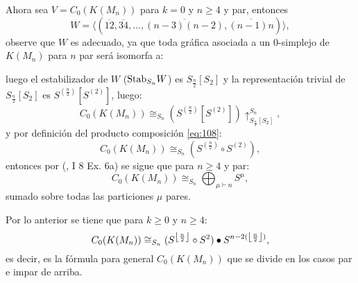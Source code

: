 \documentclass[12pt]{book}
\DeclarePairedDelimiter\floor{\lfloor}{\rfloor}
\theoremstyle{definition}
\newcounter{in}
\newcounter{ini}
\begin{document}
  Ahora sea $V = C_{0}(K(M_n))$ para $k=0$ y $n \geq 4$ y par, entonces
  $$W = \langle (\overline{12},\overline{34},\ldots,\overline{(n-3)(n-2)}, \overline{(n-1)n}) \rangle,$$
    observe que $W$ es adecuado, ya que toda gráfica asociada a un $0$-simplejo de $K(M_{n})$ para $n$ par será isomorfa a:
   \begin{center}
\end{center}
luego el estabilizador de $W$ ($\textup{Stab}_{S_{n}} W$) es
$S_{\frac{n}{2}} \left [ S_{2} \right ]$ y la representación trivial
de $S_{\frac{n}{2}} \left [ S_{2} \right ]$ es $S^{(\frac{n}{2})}
\left [ S^{(2)} \right ]$, luego:
\begin{equation}
C_{0}(K(M_{n})) \cong_{S_{n}} (S^{(\frac{n}{2})} \left [ S^{(2)} \right ])\uparrow_{S_{\frac{n}{2}} \left [ S_{2} \right ]}^{S_{n}},
\end{equation}
y por definición del producto composición \ref{eq:108}:
\begin{equation}
C_{0}(K(M_{n})) \cong_{S_{n}} (S^{(\frac{n}{2})} \circ S^{(2)}),
\end{equation}
entonces por \normalfont(\cite{macdonald1998symmetric}, I 8 Ex. 6a) se sigue que
para $n \geq 4$ y par:
\begin{equation}
  \label{eq:97}
   C_{0}(K(M_n)) \cong_{S_{n}} \bigoplus_{\mu \vdash n} S^{\mu},
\end{equation}
sumado sobre todas las particiones $\mu$ pares.



Por lo anterior se tiene que para $k \geq 0$ y $n \geq 4$:
\begin{equation}
  \label{eq:113}
  C_{0}(K(M_n)) \cong_{S_{n}} (S^{\floor*{\frac{n}{2}}} \circ S^{2}) \bullet S^{n-2(\floor*{\frac{n}{2}})},
\end{equation}
es decir, es la fórmula para general $C_{0}(K(M_n))$ que se divide en
los casos par e impar de arriba.
\end{document}
